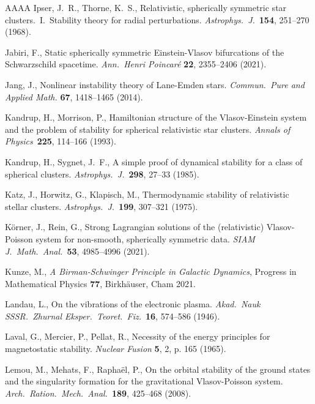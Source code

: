 \documentclass[11pt]{article}
\begin{document}
\begin{thebibliography}{AAAA}
  {\sc Ipser, J.~R., Thorne, K.~S.},
  Relativistic, spherically symmetric star clusters.\
  I.\ Stability theory for radial perturbations.
  {\em Astrophys.\ J.}\ {\bf 154}, 251--270 (1968).

   {\sc Jabiri, F.},
   Static spherically symmetric Einstein-Vlasov bifurcations of the
   Schwarzschild spacetime.
   {\em Ann.\ Henri Poincar\'e}
   {\bf 22}, 2355--2406 (2021).  

   {\sc Jang, J.},
   Nonlinear instability theory of Lane-Emden stars.
   {\em Commun.\ Pure and Applied Math.}
   {\bf 67}, 1418--1465 (2014).
   
  {\sc Kandrup, H., Morrison, P.},
  Hamiltonian structure of the Vlasov-Einstein system and the problem
  of stability for spherical relativistic star clusters.
  {\em Annals of Physics}\
  {\bf 225}, 114--166 (1993).

  {\sc Kandrup, H., Sygnet, J.~F.},
  A simple proof of dynamical stability for a class of spherical clusters.
  {\em Astrophys.\ J.}\
  {\bf 298}, 27--33 (1985).

  {\sc Katz, J., Horwitz, G., Klapisch, M.},
  Thermodynamic stability of relativistic stellar clusters.
  {\em Astrophys.\ J.}\ 
  {\bf 199}, 307--321 (1975).

\bibitem{KoeRe} %
  {\sc K\"orner, J., Rein, G.},
  Strong Lagrangian solutions of the (relativistic)
  Vlasov-Poisson system for non-smooth, spherically symmetric data.
  {\em SIAM J.\ Math.\ Anal.}\ 
  {\bf 53}, 4985--4996 (2021).
  
\bibitem{Kunze} %
  {\sc Kunze, M.},
  \textit{A Birman-Schwinger Principle in Galactic Dynamics},
  Progress in Mathematical Physics {\bf77}, Birkh\"auser, Cham 2021.

  {\sc Landau, L.},
  On the vibrations of the electronic plasma. 
  {\em Akad.\ Nauk SSSR.\ Zhurnal Eksper.\ Teoret.\ Fiz.}\
  {\bf 16}, 574--586 (1946).

\bibitem{LaMePe} %
  {\sc Laval, G., Mercier, P., Pellat, R.},
  Necessity of the energy principles for magnetostatic stability.
  {\em Nuclear Fusion}
  {\bf 5}, 2, p. 165 (1965).

\bibitem{LeMeRa1} %
  {\sc Lemou, M., Mehats, F., Rapha\"el, P.},
  On the orbital stability of the ground states and the
  singularity formation for the gravitational Vlasov-Poisson
  system.
  {\em Arch.\ Ration.\ Mech.\ Anal.}\ 
  {\bf 189}, 425--468 (2008). 


\end{thebibliography}
\end{document}
